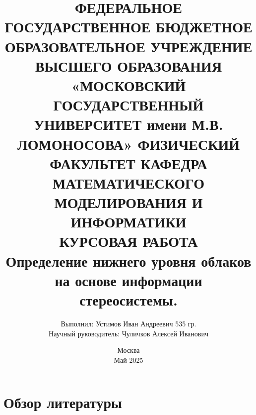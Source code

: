 \documentclass[11pt]{article} %
\begin{document}
	
	\title{ФЕДЕРАЛЬНОЕ ГОСУДАРСТВЕННОЕ БЮДЖЕТНОЕ
		ОБРАЗОВАТЕЛЬНОЕ УЧРЕЖДЕНИЕ ВЫСШЕГО ОБРАЗОВАНИЯ
		«МОСКОВСКИЙ ГОСУДАРСТВЕННЫЙ УНИВЕРСИТЕТ имени М.В. ЛОМОНОСОВА» ФИЗИЧЕСКИЙ ФАКУЛЬТЕТ КАФЕДРА МАТЕМАТИЧЕСКОГО МОДЕЛИРОВАНИЯ И ИНФОРМАТИКИ\\
		\vspace{30mm}
		КУРСОВАЯ РАБОТА\\
		Определение нижнего уровня облаков на основе информации стереосистемы.\vspace{15mm}}
	
	\author{
		\hspace{70mm}Выполнил: Устимов Иван Андреевич 535 гр.\\
		\vspace{15mm}
		\hspace{70mm}Научный руководитель: Чуличков Алексей Иванович\\
		\vspace{15mm}}
	
	\date{ Москва \\Май 2025}
	
	\maketitle
	\thispagestyle{empty}
	\pagebreak
	
	\tableofcontents
	\pagebreak
	
	
	\section{Обзор литературы}
	\vspace{3mm}\hspace{5mm}
	
\end{document}
